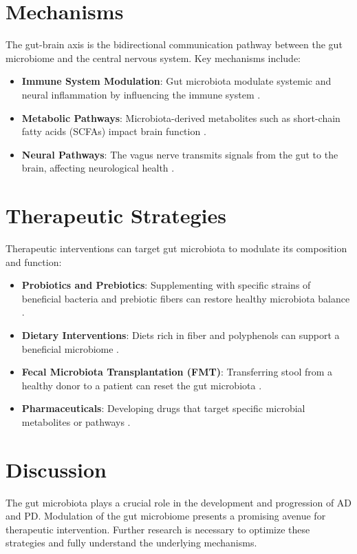 \documentclass[12pt]{article}
\begin{document}
\section{Mechanisms}
The gut-brain axis is the bidirectional communication pathway between the gut microbiome and the central nervous system. Key mechanisms include:
\begin{itemize}
    \item \textbf{Immune System Modulation}: Gut microbiota modulate systemic and neural inflammation by influencing the immune system \cite{cryan2019}.
    \item \textbf{Metabolic Pathways}: Microbiota-derived metabolites such as short-chain fatty acids (SCFAs) impact brain function \cite{silva2020}.
    \item \textbf{Neural Pathways}: The vagus nerve transmits signals from the gut to the brain, affecting neurological health \cite{baj2019}.
\end{itemize}

\section{Therapeutic Strategies}
Therapeutic interventions can target gut microbiota to modulate its composition and function:
\begin{itemize}
    \item \textbf{Probiotics and Prebiotics}: Supplementing with specific strains of beneficial bacteria and prebiotic fibers can restore healthy microbiota balance \cite{marques2016}.
    \item \textbf{Dietary Interventions}: Diets rich in fiber and polyphenols can support a beneficial microbiome \cite{westfall2017}.
    \item \textbf{Fecal Microbiota Transplantation (FMT)}: Transferring stool from a healthy donor to a patient can reset the gut microbiota \cite{huang2019}.
    \item \textbf{Pharmaceuticals}: Developing drugs that target specific microbial metabolites or pathways \cite{qiao2018}.
\end{itemize}

\section{Discussion}
The gut microbiota plays a crucial role in the development and progression of AD and PD. Modulation of the gut microbiome presents a promising avenue for therapeutic intervention. Further research is necessary to optimize these strategies and fully understand the underlying mechanisms.



\end{document}
